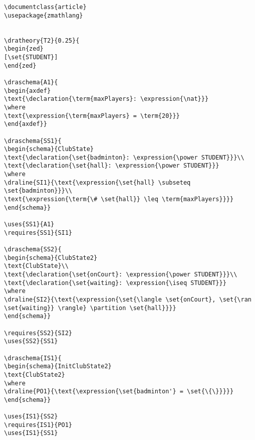 \begin{verbatim}
\documentclass{article}
\usepackage{zmathlang}


\dratheory{T2}{0.25}{
\begin{zed}
[\set{STUDENT}]
\end{zed}

\draschema{A1}{
\begin{axdef}
\text{\declaration{\term{maxPlayers}: \expression{\nat}}}
\where
\text{\expression{\term{maxPlayers} = \term{20}}}
\end{axdef}}

\draschema{SS1}{
\begin{schema}{ClubState}
\text{\declaration{\set{badminton}: \expression{\power STUDENT}}}\\
\text{\declaration{\set{hall}: \expression{\power STUDENT}}}
\where
\draline{SI1}{\text{\expression{\set{hall} \subseteq \set{badminton}}}\\
\text{\expression{\term{\# \set{hall}} \leq \term{maxPlayers}}}}
\end{schema}}

\uses{SS1}{A1}
\requires{SS1}{SI1}

\draschema{SS2}{
\begin{schema}{ClubState2}
\text{ClubState}\\
\text{\declaration{\set{onCourt}: \expression{\power STUDENT}}}\\
\text{\declaration{\set{waiting}: \expression{\iseq STUDENT}}}
\where
\draline{SI2}{\text{\expression{\set{\langle \set{onCourt}, \set{\ran \set{waiting}} \rangle} \partition \set{hall}}}}
\end{schema}}

\requires{SS2}{SI2}
\uses{SS2}{SS1}

\draschema{IS1}{
\begin{schema}{InitClubState2}
\text{ClubState2}
\where
\draline{PO1}{\text{\expression{\set{badminton'} = \set{\{\}}}}}
\end{schema}}

\uses{IS1}{SS2}
\requires{IS1}{PO1}
\uses{IS1}{SS1}


\end{verbatim}
